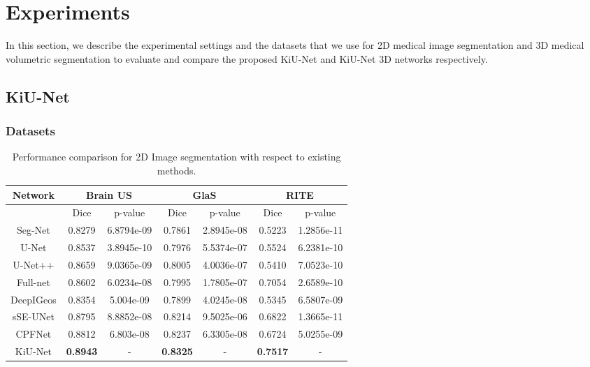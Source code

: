 \documentclass[journal,twoside,web]{ieeecolor}
\begin{document}
\section{Experiments}

In this section,  we describe the experimental settings and the datasets  that we use for 2D medical image segmentation and  3D medical volumetric segmentation   to evaluate and compare the proposed  KiU-Net and KiU-Net 3D networks respectively. 

\subsection{KiU-Net}

\subsubsection{Datasets}
\begin{table*}[htbp]
	\centering
	\caption{Performance comparison for 2D Image segmentation with respect to existing methods.}
	\begin{tabular}{c|cc|cc|cc}
		\hline
		Network   & \multicolumn{2}{c|}{Brain US}       & \multicolumn{2}{c|}{GlaS} & \multicolumn{2}{c}{RITE} \\ \hline
		& \multicolumn{1}{c|}{Dice} & p-value & \multicolumn{1}{c|}{Dice}        & p-value     & \multicolumn{1}{c|}{Dice}        & p-value     \\ \cline{2-7} 
		Seg-Net \cite{badrinarayanan2017segnet}  & 0.8279                    & 6.8794e-09        & 0.7861      & 2.8945e-08            & 0.5223      & 1.2856e-11            \\
		U-Net \cite{ronneberger2015u}    & 0.8537                    & 3.8945e-10        & 0.7976      & 5.5374e-07            & 0.5524      & 6.2381e-10            \\
		U-Net++  \cite{zhou2018unet++} & 0.8659                    & 9.0365e-09        & 0.8005      & 4.0036e-07            & 0.5410      & 7.0523e-10            \\
		Full-net \cite{qu2019improving} & 0.8602                    & 6.0234e-08         & 0.7995      & 1.7805e-07             & 0.7054      & 2.6589e-10             \\
		DeepIGeos \cite{wang2018deepigeos} & 0.8354                    & 5.004e-09        & 0.7899      & 4.0245e-08             & 0.5345      & 6.5807e-09            \\
		sSE-UNet \cite{roy2018recalibrating} & 0.8795                    & 8.8852e-08         & 0.8214      &9.5025e-06             & 0.6822      & 1.3665e-11            \\
		CPFNet \cite{feng2020cpfnet}   & 0.8812                    & 6.803e-08         & 0.8237      & 6.3305e-08             & 0.6724      & 5.0255e-09            \\
		KiU-Net   & \textbf{0.8943}                    & -         & \textbf{0.8325}      & -            & \textbf{0.7517}      & -           
	\end{tabular}
	
	
	\label{brain}
\end{table*}
\end{document}
